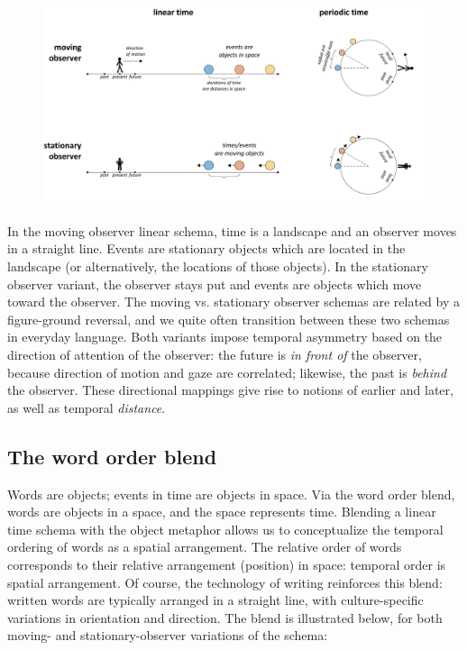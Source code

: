   
\begin{figure}
\includegraphics[width=\textwidth]{figures/Tilsen-img38.png}
\caption{\missingcaption}
\label{fig:}
\end{figure}
 

  In the moving observer linear schema, time is a landscape and an observer moves in a straight line. Events are stationary objects which are located in the landscape (or alternatively, the locations of those objects). In the stationary observer variant, the observer stays put and events are objects which move toward the observer. The moving vs. stationary observer schemas are related by a figure-ground reversal, and we quite often transition between these two schemas in everyday language. Both variants impose temporal asymmetry based on the direction of attention of the observer: the future is \textit{in front of} the observer, because direction of motion and gaze are correlated; likewise, the past is \textit{behind} the observer. These directional mappings give rise to notions of earlier and later, as well as temporal \textit{distance}. 

\subsection{The word order blend}

Words are objects; events in time are objects in space. Via the word order blend, words are objects in a space, and the space represents time. Blending a linear time schema with the object metaphor allows us to conceptualize the temporal ordering of words as a spatial arrangement. The relative order of words corresponds to their relative arrangement (position) in space: temporal order is spatial arrangement. Of course, the technology of writing reinforces this blend: written words are typically arranged in a straight line, with culture-specific variations in orientation and direction. The blend is illustrated below, for both moving- and stationary-observer variations of the schema:

